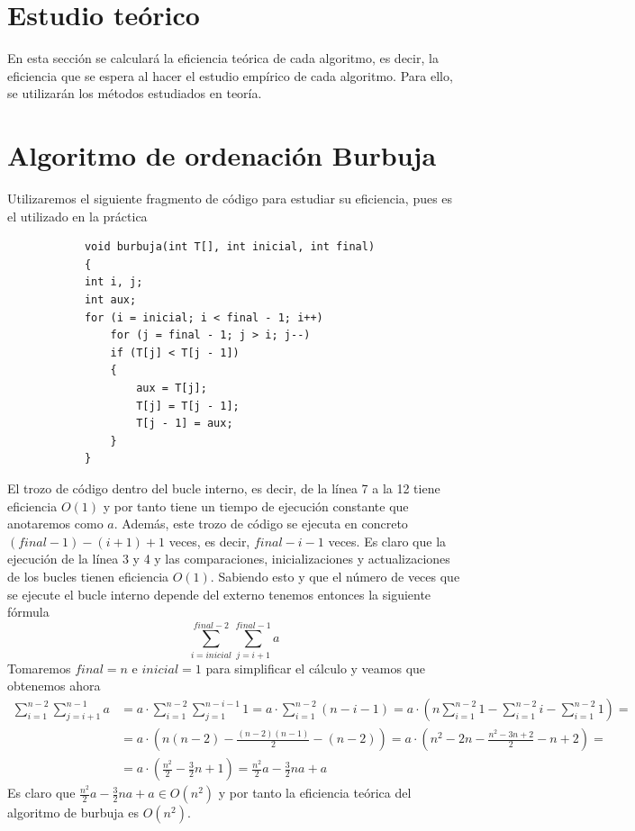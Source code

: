\documentclass[11pt,openany]{book}
\begin{document}
\section{Estudio teórico}
En esta sección se calculará la eficiencia teórica de cada algoritmo, es decir, la eficiencia que se espera al hacer el
estudio empírico de cada algoritmo. Para ello, se utilizarán los métodos estudiados en teoría.
\section*{Algoritmo de ordenación Burbuja}
Utilizaremos el siguiente fragmento de código para estudiar su eficiencia, pues es el utilizado en la práctica
\begin{lstlisting}
            void burbuja(int T[], int inicial, int final)
            {
            int i, j;
            int aux;
            for (i = inicial; i < final - 1; i++)
                for (j = final - 1; j > i; j--)
                if (T[j] < T[j - 1])
                {
                    aux = T[j];
                    T[j] = T[j - 1];
                    T[j - 1] = aux;
                }
            }
        \end{lstlisting}
El trozo de código dentro del bucle interno, es decir, de la línea 7 a la 12 tiene eficiencia $O(1)$ y por tanto
tiene un tiempo de ejecución constante que anotaremos como $a$. Además, este trozo de código se ejecuta
en concreto $(final-1)-(i+1) +1$ veces, es decir, $final-i-1$ veces. Es claro que la ejecución de la línea 3 y 4
y las comparaciones, inicializaciones y actualizaciones de los bucles tienen eficiencia $O(1)$. Sabiendo esto y que
el número de veces que se ejecute el bucle interno depende del externo tenemos entonces la siguiente fórmula
\begin{equation*}
    \sum_{i=inicial}^{final-2} \sum_{j=i+1}^{final-1}a
\end{equation*}
Tomaremos $final =  n$ e $inicial = 1$ para simplificar el cálculo y veamos que obtenemos ahora
\begin{equation*}\begin{split}
        \sum_{i=1}^{n-2} \sum_{j=i+1}^{n-1}a&= a \cdot \sum_{i=1}^{n-2} \sum_{j=1}^{n-i-1}1
        = a \cdot \sum_{i=1}^{n-2} (n-i-1) =  a \cdot ( n\sum_{i=1}^{n-2} 1 - \sum_{i=1}^{n-2} i - \sum_{i=1}^{n-2} 1)= \\
        &= a \cdot ( n(n-2) - \frac{(n-2)(n-1)}{2} - (n-2))= a \cdot ( n^2-2n - \frac{n^2-3n+2}{2} - n+2)=\\
        &= a \cdot \left(\frac{n^2}{2}-\frac{3}{2}n+1\right)= \frac{n^2}{2}a-\frac{3}{2}na+a
    \end{split}\end{equation*}
Es claro que $\frac{n^2}{2}a-\frac{3}{2}na+a \in O(n^2)$ y por tanto la eficiencia teórica del algoritmo de burbuja es $O(n^2)$.
\end{document}
